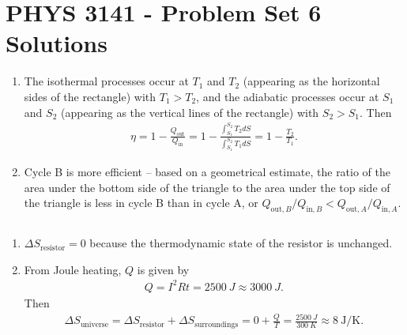 \documentclass[a4paper,12pt]{article}
\begin{document}
\section*{PHYS 3141 - Problem Set 6 Solutions}

\begin{enumerate}[label=\textbf{[\arabic*]}]
    \item
        \begin{enumerate}
            \item
                The isothermal processes occur at $T_1$ and $T_2$ (appearing as the horizontal sides of the rectangle) with $T_1 > T_2$, and the adiabatic processes occur at $S_1$ and $S_2$ (appearing as the vertical lines of the rectangle) with $S_2 > S_1$. Then
                \begin{align*}
                    \eta = 1 - \frac{Q_{\text{out}}}{Q_{\text{in}}} = 1 - \frac{\int_{S_1}^{S_2} T_2 dS}{\int_{S_1}^{S_2} T_1 dS} = 1 - \frac{T_2}{T_1}.
                \end{align*}

            \item
                Cycle B is more efficient -- based on a geometrical estimate, the ratio of the area under the bottom side of the triangle to the area under the top side of the triangle is less in cycle B than in cycle A, or $Q_{\text{out}, B} / Q_{\text{in}, B} < Q_{\text{out}, A} / Q_{\text{in}, A}$.
        \end{enumerate}

    \item
        $ $ \\[3in]

    \item
        \begin{enumerate}
            \item
                $\Delta S_{\text{resistor}} = 0$ because the thermodynamic state of the resistor is unchanged.

            \item
                From Joule heating, $Q$ is given by
                \begin{align*}
                    Q = I^2 Rt = \SI{2500}{J} \approx \SI{3000}{J}.
                \end{align*}
                Then
                \begin{align*}
                    \Delta S_{\text{universe}} = \Delta S_{\text{resistor}} + \Delta S_{\text{surroundings}} = 0 + \frac{Q}{T} = \frac{\SI{2500}{J}}{\SI{300}{K}} \approx \SI{8}{\J\per\K}.
                \end{align*}


\end{enumerate}
\end{enumerate}
\end{document}
